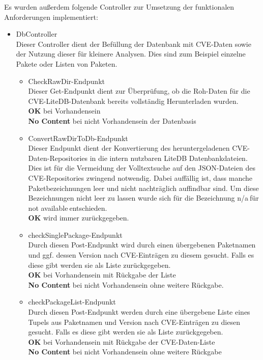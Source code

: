     \noindent Es wurden außerdem folgende Controller zur Umsetzung der funktionalen Anforderungen implementiert:
    \begin{itemize}
        \item DbController \label{api_controller:three}\\
            Dieser Controller dient der Befüllung der Datenbank mit \ac{CVE}-Daten sowie der Nutzung dieser für kleinere Analysen. Dies sind zum Beispiel einzelne Pakete oder Listen von Paketen.
            \begin{itemize}
                \item CheckRawDir-Endpunkt \\
                    Dieser Get-Endpunkt dient zur Überprüfung, ob die Roh-Daten für die \ac{CVE}-LiteDB-Datenbank bereits vollständig Herunterladen wurden.
                    \\
                    \textbf{OK} bei Vorhandensein
                    \\
                    \textbf{No Content} bei nicht Vorhandensein der Datenbasis
                \item ConvertRawDirToDb-Endpunkt \\
                    Dieser Endpunkt dient der Konvertierung des heruntergeladenen \ac{CVE}-Daten-Repositories in die intern nutzbaren LiteDB Datenbankdateien.
                    Dies ist für die Vermeidung der Volltextsuche auf den \ac{JSON}-Dateien des \ac{CVE}-Repositories zwingend notwendig.
                    Dabei auffällig ist, dass manche Paketbezeichnungen leer und nicht nachträglich auffindbar sind.
                    Um diese Bezeichnungen nicht leer zu lassen wurde sich für die Bezeichnung \glqq n/a\grqq$~$für \glqq not available\grqq$~$entschieden.
                    \\
                    \textbf{OK} wird immer zurückgegeben.
                \item checkSinglePackage-Endpunkt \\
                    Durch diesen Post-Endpunkt wird durch einen übergebenen Paketnamen und ggf. dessen Version nach \ac{CVE}-Einträgen zu diesem gesucht.
                    Falls es diese gibt werden sie als Liste zurückgegeben.
                    \\
                    \textbf{OK} bei Vorhandensein mit Rückgabe der Liste
                    \\
                    \textbf{No Content} bei nicht Vorhandensein ohne weitere Rückgabe.
                \item checkPackageList-Endpunkt \\
                    Durch diesen Post-Endpunkt werden durch eine übergebene Liste eines Tupels aus Paketnamen und Version nach \ac{CVE}-Einträgen zu diesen gesucht.
                    Falls es diese gibt werden sie als Liste zurückgegeben.
                    \\
                    \textbf{OK} bei Vorhandensein mit Rückgabe der \ac{CVE}-Daten-Liste
                    \\
                    \textbf{No Content} bei nicht Vorhandensein ohne weitere Rückgabe
            \end{itemize}


\end{itemize}
